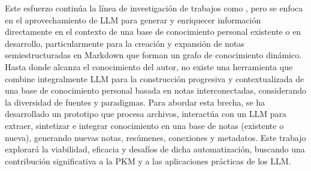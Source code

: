 Este esfuerzo continúa la línea de investigación de trabajos como \cite{fragaAutomaticGenerationKnowledge2023}, pero se enfoca en el aprovechamiento de LLM para generar y enriquecer información directamente en el contexto de una base de conocimiento personal existente o en desarrollo, particularmente para la creación y expansión de notas semiestructuradas en Markdown que forman un grafo de conocimiento dinámico. Hasta donde alcanza el conocimiento del autor, no existe una herramienta que combine integralmente LLM para la construcción progresiva y contextualizada de una base de conocimiento personal basada en notas interconectadas, considerando la diversidad de fuentes y paradigmas. Para abordar esta brecha, se ha desarrollado un prototipo que procesa archivos, interactúa con un LLM para extraer, sintetizar e integrar conocimiento en una base de notas (existente o nueva), generando nuevas notas, resúmenes, conexiones y metadatos. Este trabajo explorará la viabilidad, eficacia y desafíos de dicha automatización, buscando una contribución significativa a la PKM y a las aplicaciones prácticas de los LLM.